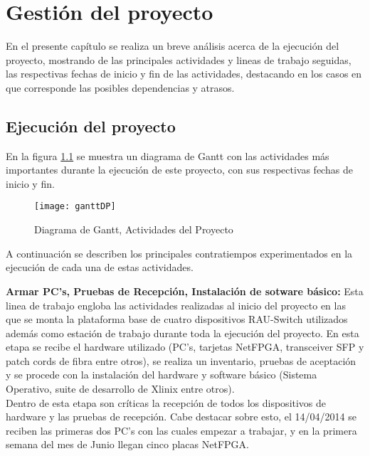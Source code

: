 \chapter{Gestión del proyecto}

\ifpdf
    \graphicspath{{Chapter7/Figs/Raster/}{Chapter7/Figs/PDF/}{Chapter7/Figs/}}
\else
    \graphicspath{{Chapter7/Figs/Vector/}{Chapter7/Figs/}}
\fi

En el presente cap\'itulo se realiza un breve análisis acerca de la ejecuci\'on del proyecto, mostrando de las principales actividades y lineas de trabajo seguidas, las respectivas fechas de inicio y fin de las actividades, destacando en los casos en que corresponde las posibles dependencias y atrasos.

\section{Ejecuci\'on del proyecto}

En la figura \ref{fig:gantt} se muestra un diagrama de Gantt con las actividades m\'as importantes durante la ejecuci\'on de este proyecto, con sus respectivas fechas de inicio y fin.

\begin{figure}[h!] 
\centering    
\texttt{[image: ganttDP]}
\caption[Diagrama de Gantt, Actividades del Proyecto]{Diagrama de Gantt, Actividades del Proyecto}
\label{fig:gantt}
\end{figure}

A continuaci\'on se describen los principales contratiempos experimentados en la ejecuci\'on de cada una de estas actividades.

\textbf{Armar PC's, Pruebas de Recepción, Instalación de sotware b\'asico:} Esta linea de trabajo engloba las actividades realizadas al inicio del proyecto en las que se monta la plataforma base de cuatro dispositivos RAU-Switch utilizados adem\'as como estaci\'on de trabajo durante toda la ejecuci\'on del proyecto. En esta etapa se recibe el hardware utilizado (PC's, tarjetas NetFPGA, transceiver SFP y patch cords de fibra entre otros), se realiza un inventario, pruebas de aceptaci\'on y se procede con la instalaci\'on del hardware y software b\'asico (Sistema Operativo, suite de desarrollo de Xlinix entre otros).\\

Dentro de esta etapa son cr\'iticas la recepci\'on de todos los dispositivos de hardware y las pruebas de recepci\'on. Cabe destacar sobre esto, el 14/04/2014 se reciben las primeras dos PC's con las cuales empezar a trabajar, y en la primera semana del mes de Junio llegan cinco placas NetFPGA.\\

